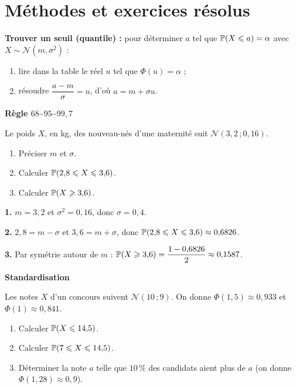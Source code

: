 \section{Méthodes et exercices résolus}

\begin{methode}
	\textbf{Trouver un seuil (quantile) :} pour déterminer $a$ tel que
	$\mathbb{P}(X\leqslant a)=\alpha$ avec $X\sim\mathscr{N}(m,\sigma^2)$ :
	\begin{enumerate}
		\item lire dans la table le réel $u$ tel que $\Phi(u)=\alpha$ ;
		\item résoudre $\dfrac{a-m}{\sigma}=u$, d'où $a = m+\sigma u$.
	\end{enumerate}
\end{methode}

\exerciceresolu
\textbf{Règle $68$–$95$–$99{,}7$}

Le poids $X$, en kg, des nouveau-nés d'une maternité suit
$\mathscr{N}(3{,}2\,;0{,}16)$.
\begin{enumerate}
	\item Préciser $m$ et $\sigma$.
	\item Calculer $\mathbb{P}(2{,}8\leqslant X\leqslant3{,}6)$.
	\item Calculer $\mathbb{P}(X\geqslant3{,}6)$.
\end{enumerate}

\solution

\textbf{1.} $m=3{,}2$ et $\sigma^2=0{,}16$, donc $\sigma=0{,}4$.

\textbf{2.} $2{,}8 = m-\sigma$ et $3{,}6 = m+\sigma$, donc
$\mathbb{P}(2{,}8\leqslant X\leqslant3{,}6) \approx 0{,}6826$.

\textbf{3.} Par symétrie autour de $m$ :
$\mathbb{P}(X\geqslant3{,}6) = \dfrac{1-0{,}6826}{2} \approx 0{,}1587$.

\exerciceresolu
\textbf{Standardisation}

Les notes $X$ d'un concours suivent $\mathscr{N}(10\,;9)$. On donne
$\Phi(1{,}5)\approx 0{,}933$ et $\Phi(1)\approx 0{,}841$.
\begin{enumerate}
	\item Calculer $\mathbb{P}(X\leqslant 14{,}5)$.
	\item Calculer $\mathbb{P}(7\leqslant X\leqslant 14{,}5)$.
	\item Déterminer la note $a$ telle que $10\,\%$ des candidats aient plus
	de $a$ (on donne $\Phi(1{,}28)\approx 0{,}9$).
\end{enumerate}

